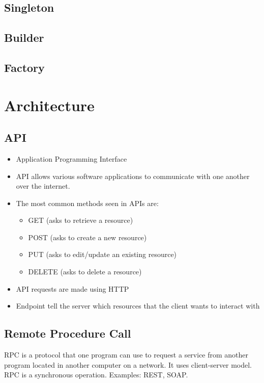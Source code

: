 \documentclass[a4paper, 11.25pt]{article}
\begin{document}
\subsection{Singleton}
\subsection{Builder}
\subsection{Factory}

\clearpage
\section{Architecture}
\subsection{API}
\begin{itemize}
    \item Application Programming Interface
    \item API allows various software applications to communicate with one another over the internet.
    \item The most common methods seen in APIs are:
    \begin{itemize}
        \item GET (asks to retrieve a resource)
        \item POST (asks to create a new resource)
        \item PUT (asks to edit/update an existing resource)
        \item DELETE (asks to delete a resource)
    \end{itemize}
    \item API requests are made using HTTP
    \item Endpoint tell the server which resources that the client wants to interact with
\end{itemize}
\subsection{Remote Procedure Call}
RPC is a protocol that one program can use to request a service from another program located in another computer on a network. It uses client-server model. RPC is a synchronous operation. Examples: REST, SOAP.
\end{document}
